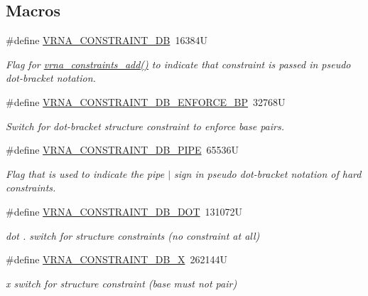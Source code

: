 \subsection*{Macros}
\begin{DoxyCompactItemize}
\item 
\#define \mbox{\hyperlink{group__hard__constraints_ga4bfc2f15c4f261c62a11af9d2aa80c90}{V\+R\+N\+A\+\_\+\+C\+O\+N\+S\+T\+R\+A\+I\+N\+T\+\_\+\+DB}}~16384U
\begin{DoxyCompactList}\small\item\em Flag for \mbox{\hyperlink{group__constraints_ga35a401f680969a556858a8dd5f1d07cc}{vrna\+\_\+constraints\+\_\+add()}} to indicate that constraint is passed in pseudo dot-\/bracket notation. \end{DoxyCompactList}\item 
\#define \mbox{\hyperlink{group__hard__constraints_ga29ebe940110d60ab798fdacbcdbbfb7d}{V\+R\+N\+A\+\_\+\+C\+O\+N\+S\+T\+R\+A\+I\+N\+T\+\_\+\+D\+B\+\_\+\+E\+N\+F\+O\+R\+C\+E\+\_\+\+BP}}~32768U
\begin{DoxyCompactList}\small\item\em Switch for dot-\/bracket structure constraint to enforce base pairs. \end{DoxyCompactList}\item 
\#define \mbox{\hyperlink{group__hard__constraints_ga13053547a2de5532b64b64d35e097ae1}{V\+R\+N\+A\+\_\+\+C\+O\+N\+S\+T\+R\+A\+I\+N\+T\+\_\+\+D\+B\+\_\+\+P\+I\+PE}}~65536U
\begin{DoxyCompactList}\small\item\em Flag that is used to indicate the pipe \textquotesingle{}$\vert$\textquotesingle{} sign in pseudo dot-\/bracket notation of hard constraints. \end{DoxyCompactList}\item 
\#define \mbox{\hyperlink{group__hard__constraints_ga369bea82eae75fbe626f409fa425747e}{V\+R\+N\+A\+\_\+\+C\+O\+N\+S\+T\+R\+A\+I\+N\+T\+\_\+\+D\+B\+\_\+\+D\+OT}}~131072U
\begin{DoxyCompactList}\small\item\em dot \textquotesingle{}.\textquotesingle{} switch for structure constraints (no constraint at all) \end{DoxyCompactList}\item 
\#define \mbox{\hyperlink{group__hard__constraints_ga7283bbe0f8954f7b030ecc3f2d1932b2}{V\+R\+N\+A\+\_\+\+C\+O\+N\+S\+T\+R\+A\+I\+N\+T\+\_\+\+D\+B\+\_\+X}}~262144U
\begin{DoxyCompactList}\small\item\em \textquotesingle{}x\textquotesingle{} switch for structure constraint (base must not pair) \end{DoxyCompactList}\item 

\end{DoxyCompactItemize}
